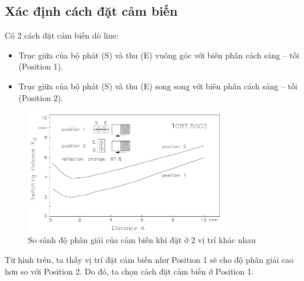        \subsection{Xác định cách đặt cảm biến}
            \hspace*{0.6cm}Có 2 cách đặt cảm biến dò line:
            \begin{itemize}
                \item Trục giữa của bộ phát (S) và thu (E) vuông góc với biên phân cách sáng – tối (Position 1).
                \item Trục giữa của bộ phát (S) và thu (E) song song với biên phân cách sáng – tối (Position 2).
            \end{itemize}
            \begin{figure}[H]
                \centering
                \includegraphics[width=0.8\textwidth]{pictures/chapter4/c4_p6_SensorPosition.png}
                \caption{So sánh độ phân giải của cảm biến khi đặt ở 2 vị trí khác nhau}
                \label{fig:4-5}
            \end{figure}
            \hspace*{0.6cm}Từ hình trên, ta thấy vị trí đặt cảm biến như Position 1 sẽ cho độ phân giải cao hơn so với Position 2. Do đó, ta chọn cách đặt cảm biến ở Position 1.
